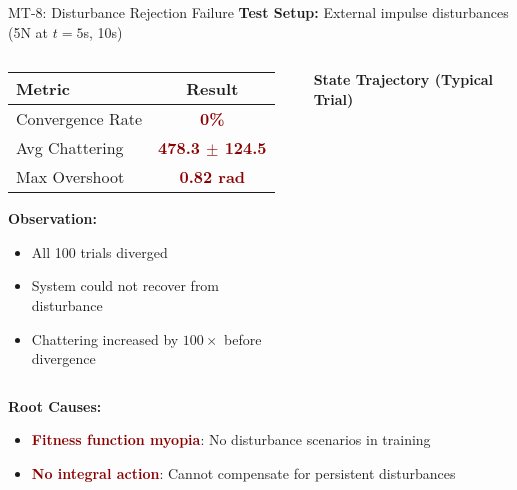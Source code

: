 \documentclass[10pt,aspectratio=169]{beamer}
\newcommand{\emphred}[1]{\textcolor{darkred}{\textbf{#1}}}
\begin{document}
\begin{frame}{MT-8: Disturbance Rejection Failure}
\textbf{Test Setup:} External impulse disturbances (5N at $t=5$s, 10s)

\vspace{0.3cm}
\begin{columns}
\begin{column}{0.5\textwidth}
\begin{table}
\small
\begin{tabular}{lc}
\toprule
\textbf{Metric} & \textbf{Result} \\
\midrule
Convergence Rate & \emphred{0\%} \\
Avg Chattering & \emphred{478.3 $\pm$ 124.5} \\
Max Overshoot & \emphred{0.82 rad} \\
\bottomrule
\end{tabular}
\end{table}

\vspace{0.3cm}
\textbf{Observation:}
\begin{itemize}
    \item All 100 trials diverged
    \item System could not recover from disturbance
    \item Chattering increased by $100\times$ before divergence
\end{itemize}
\end{column}
\begin{column}{0.5\textwidth}
\begin{center}
\textbf{State Trajectory (Typical Trial)}
\end{center}
\end{column}
\end{columns}

\vspace{0.3cm}
\textbf{Root Causes:}
\begin{itemize}
    \item \emphred{Fitness function myopia}: No disturbance scenarios in training
    \item \emphred{No integral action}: Cannot compensate for persistent disturbances
\end{itemize}
\end{frame}
\end{document}

